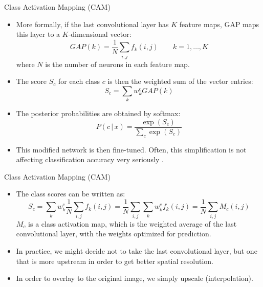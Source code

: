 \documentclass[xcolor=pdftex,dvipsnames,table]{beamer}
\begin{document}
\begin{frame}{Class Activation Mapping (CAM)}
\begin{itemize}
\item More formally, if the last convolutional layer has $K$ feature maps, GAP maps this layer to a $K$-dimensional vector: 
\begin{equation}
	GAP(k) = \frac{1}{N}\sum_{i,j}f_k(i,j) \quad \quad k = 1, \ldots, K
\end{equation}
where $N$ is the number of neurons in each feature map. 
\item The score $S_c$ for each class $c$ is then the weighted sum of the vector entries:
\begin{equation}
	S_c = \sum_k w_k^c GAP(k)
\end{equation}
\item The posterior probabilities are obtained by softmax:
\begin{equation}
	P(c \, | \, x) = \frac{\exp{(S_c)}}{\sum_c \exp{(S_c)}}
\end{equation}
\item This modified network is then fine-tuned. Often, this simplification is not affecting classification accuracy very seriously \cite{Zhou:2016}. 
\end{itemize}
\end{frame}

\begin{frame}{Class Activation Mapping (CAM)}
\begin{itemize}
	\item The class scores can be written as:
	\begin{equation}
	S_c = \sum_k w_k^c \frac{1}{N}\sum_{i,j}f_k(i,j) = \frac{1}{N}\sum_{i,j} \sum_k w_k^c f_k(i,j) = \frac{1}{N}\sum_{i,j} M_c(i,j)
	\end{equation}
	$M_c$ is a class activation map, which is the weighted average of the last convolutional layer, with the weights optimized for prediction. 
	\item In practice, we might decide not to take the last convolutional layer, but one that is more upstream in order to get better spatial resolution. 
	\item In order to overlay to the original image, we simply upscale (interpolation). 
\end{itemize}
\end{frame}
\end{document}
